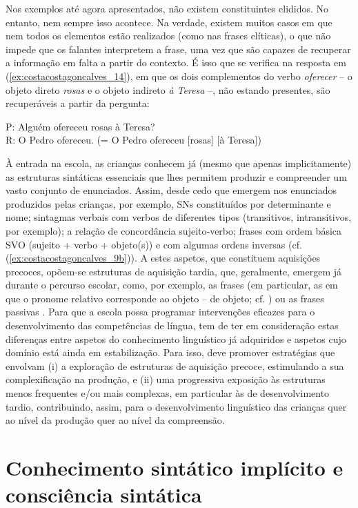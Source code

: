 \documentclass[output=paper]{LSP/langsci}
\begin{document}
Nos exemplos até agora apresentados, não existem constituintes elididos. No entanto, nem sempre isso acontece. Na verdade, existem muitos casos em que nem todos os elementos estão realizados (como nas frases elíticas), o que não impede que os falantes interpretem a frase, uma vez que são capazes de recuperar a informação em falta a partir do contexto. É isso que se verifica na resposta em (\ref{ex:costacostagoncalves_14}), em que os dois complementos do verbo \textit{oferecer} – o objeto direto \textit{rosas} e o objeto indireto \textit{à Teresa} –, não estando presentes, são recuperáveis a partir da pergunta:

\ea\label{ex:costacostagoncalves_14} P: Alguém ofereceu rosas à Teresa?\\R: O Pedro ofereceu. (= O Pedro ofereceu [rosas] [à Teresa])\z

À entrada na escola, as crianças conhecem já (mesmo que apenas implicitamente) as estruturas sintáticas essenciais que lhes permitem produzir e compreender um vasto conjunto de enunciados. Assim, desde cedo que emergem nos enunciados produzidos pelas crianças, por exemplo, SNs constituídos por determinante e nome; sintagmas verbais com verbos de diferentes tipos (transitivos, intransitivos, por exemplo); a relação de concordância sujeito‑verbo; frases com ordem básica SVO (sujeito + verbo + objeto(s)) e com algumas ordens inversas (cf. (\ref{ex:costacostagoncalves_9b})). A estes aspetos, que constituem aquisições precoces, opõem-se estruturas de aquisição tardia, que, geralmente, emergem já durante o percurso escolar, como, por exemplo, as frases  (em particular, as  em que o pronome relativo corresponde ao objeto –  de objeto; cf. \citealt{costa_etal2011}) ou as frases passivas \citep{simsim1998}. Para que a escola possa programar intervenções eficazes para o desenvolvimento das competências de língua, tem de ter em consideração estas diferenças entre aspetos do conhecimento linguístico já adquiridos e aspetos cujo domínio está ainda em estabilização. Para isso, deve promover estratégias que envolvam (i) a exploração de estruturas de aquisição precoce, estimulando a sua complexificação na produção, e (ii) uma progressiva exposição às estruturas menos frequentes e/ou mais complexas, em particular às de desenvolvimento tardio, contribuindo, assim, para o desenvolvimento linguístico das crianças quer ao nível da produção quer ao nível da compreensão.

\section{Conhecimento sintático implícito e consciência sintática}
\label{sec:costacostagoncalves_conhecimento_sint_impl}
\end{document}
